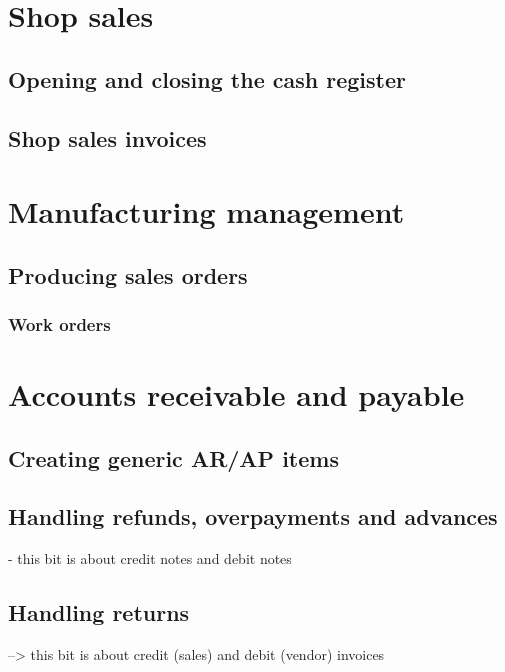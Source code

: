 \chapter{Shop sales}

\section{Opening and closing the cash register}

\section{Shop sales invoices}


\chapter{Manufacturing management}

\section{Producing sales orders}

\subsection{Work orders}



\chapter{Accounts receivable and payable}

\section{Creating generic AR/AP items}

\section{Handling refunds, overpayments and advances}

- this bit is about credit notes and debit notes

\section{Handling returns}

--> this bit is about credit (sales) and debit (vendor) invoices

